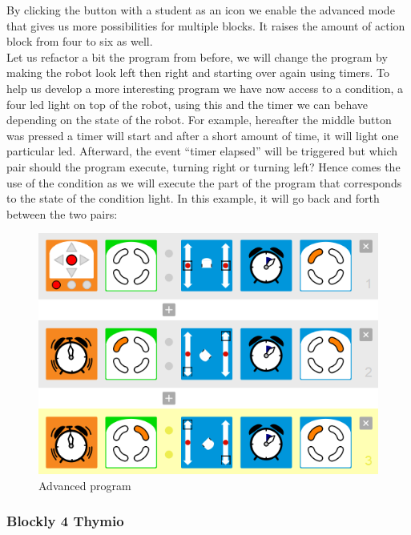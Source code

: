 \documentclass{scrartcl}
\begin{document}
By clicking the button with a student as an icon we enable the advanced mode that gives us more possibilities for multiple blocks. It raises the amount of action block from four to six as well. \\

Let us refactor a bit the program from before, we will change the program by making the robot look left then right and starting over again using timers. 
To help us develop a more interesting program we have now access to a condition, a four led light on top of the robot, using this and the timer we can behave depending on the state of the robot. 
For example, hereafter the middle button was pressed a timer will start and after a short amount of time, it will light one particular led. 
Afterward, the event “timer elapsed” will be triggered but which pair should the program execute, turning right or turning left? 
Hence comes the use of the condition as we will execute the part of the program that corresponds to the state of the condition light. 
In this example, it will go back and forth between the two pairs: \\
\begin{figure}[h!]
  \centering
  \includegraphics[scale=0.5]{./VPL/middlebtn_3E_adv}
  \caption{Advanced program}
  \label{fig:thymio_vpl_middlebtn_3e9a}
\end{figure}

\subsubsection{Blockly 4 Thymio}
\end{document}
